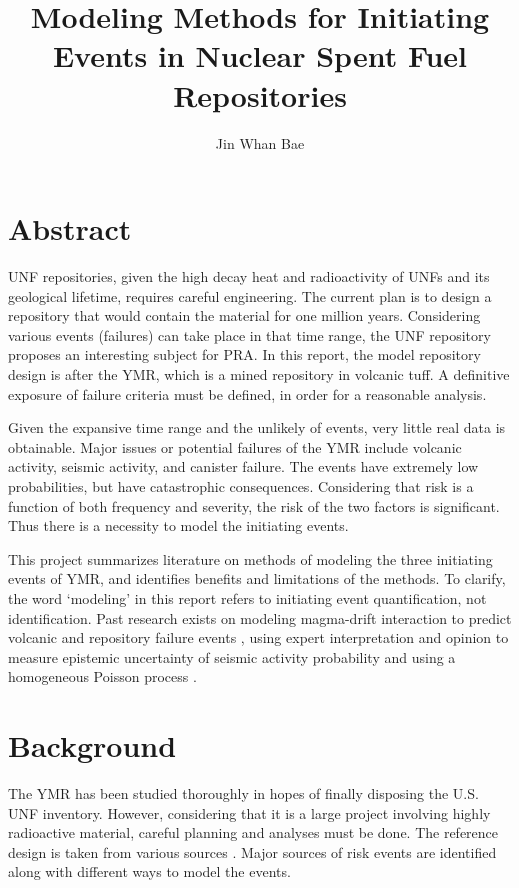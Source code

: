 \documentclass[12pt]{article}
\title{Modeling Methods for Initiating Events in Nuclear Spent Fuel Repositories}
\author{Jin Whan Bae}
\affil{Dept. of Nuclear, Plasma, and Radiological Engineering, University of Illinois at Urbana-Champaign
		  Urbana, IL}
\date{}                     %
\begin{document}
\maketitle

\section{Abstract}
\gls{UNF} repositories, given the high decay heat and radioactivity
of \glspl{UNF} and its geological lifetime, requires careful engineering. The current plan is
to design a repository that would contain the material for one million years.
Considering various events (failures) can take place in that time range,
the \gls{UNF} repository proposes an interesting subject for
\gls{PRA}. In this report, the model repository design is after the 
\gls{YMR}, which is a mined repository in volcanic tuff.
A definitive exposure of failure criteria must be defined,
in order for a reasonable analysis.  

Given the expansive
time range and the unlikely of events, very little real data is obtainable.
Major issues or potential failures of the \gls{YMR} include volcanic activity, seismic activity,
and canister failure. The events have extremely low
probabilities, but have catastrophic consequences. Considering that
risk is a function of both frequency and severity, the risk 
of the two factors is significant. Thus there is a necessity
to model the initiating events.

This project summarizes literature on methods of modeling the 
three initiating events of \gls{YMR}, and identifies
benefits and limitations of the methods. To clarify,
the word `modeling' in this report refers to initiating event
quantification, not identification.
Past research exists on 
modeling magma-drift interaction to predict volcanic and repository
failure events \cite{woods_modeling_2002},
using expert interpretation and opinion to measure epistemic
uncertainty of seismic activity probability \cite{stepp_probabilistic_2001}
and using a homogeneous Poisson process \cite{ho_risk_1992}.


\section{Background}
The \gls{YMR} has been studied thoroughly in hopes of finally
disposing the U.S. \gls{UNF} inventory. However, considering
that it is a large project involving highly radioactive material,
careful planning and analyses must be done. The reference design
is taken from various sources \cite{u.s._department_of_energy_office_of_civilian_radioactive_waste_management_national_2008, wilson_total-system_1994, rechard_evolution_2014, u.s._department_of_energy_yucca_2002}.
Major sources of risk events are identified along with different ways to model
the events. 
\end{document}
